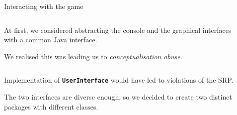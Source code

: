 \documentclass{beamer}
\begin{document}
  \begin{frame}{Interacting with the game}


    \begin{minipage}{\textwidth}
    \begin{columns}[t]
      \begin{column}{0.45\textwidth}

        \justifying
        At first, we considered abstracting the console and the graphical interfaces with a common Java interface.

        \vspace{1em}
        
        We realised this was leading us to \textit{conceptualisation abuse}. 

      \end{column}
      \begin{column}{0.45\textwidth}


      \end{column}
    \end{columns}
    \end{minipage}

    \vspace{2em}

    Implementation of \texttt{\textbf{UserInterface}} would have led to violations of the SRP.

    \vspace{1em}

    The two interfaces are diverse enough, so we decided to create two distinct packages with different classes.

  \end{frame}
\end{document}
